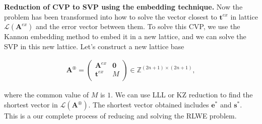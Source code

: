 \documentclass[12pt,a4paper]{article}
\numberwithin{equation}{section}
\begin{document}
\textbf{Reduction of CVP to SVP using the embedding technique.}
Now the problem has been transformed into how to solve the vector closest to $\mathbf{t}^{ex}$ in lattice $\mathcal{L}(\mathbf{A}^{ex})$ and the error vector between them.
To solve this CVP, we use the Kannon embedding method to embed it in a new lattice, and we can solve the SVP in this new lattice.
Let's construct a new lattice base

\begin{align}
    \mathbf{A}^{\circledast} = 
    \left(
    \begin{matrix}
        \mathbf{A}^{ex}    &  \mathbf{0} \\
        \mathbf{t}^{ex}    &  M    \\   
    \end{matrix}
    \right) \in \mathbb{Z}^{(2n+1) \times (2n+1)},
\end{align}

where the common value of $M$ is $1$.
We can use LLL or KZ reduction to find the shortest vector in $\mathcal{L}(\mathbf{A}^{\circledast})$.
The shortest vector obtained includes $\mathbf{e}^*$ and $\mathbf{s}^*$.
This is a our complete process of reducing and solving the RLWE problem.







\end{document}
